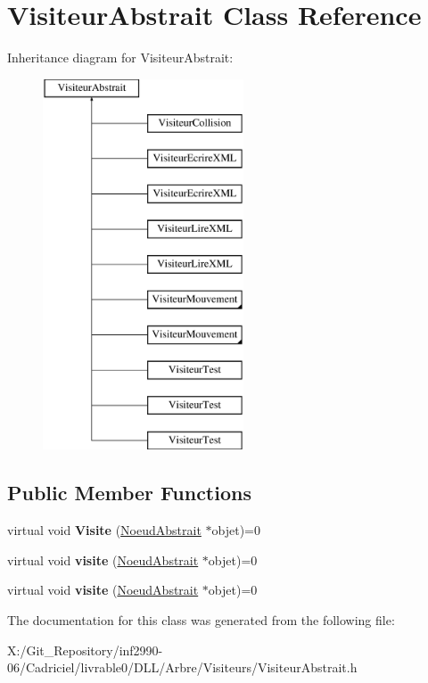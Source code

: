 \hypertarget{class_visiteur_abstrait}{\section{Visiteur\-Abstrait Class Reference}
\label{class_visiteur_abstrait}
}
Inheritance diagram for Visiteur\-Abstrait\-:\begin{figure}[H]
\begin{center}
\leavevmode
\includegraphics[height=11.000000cm]{class_visiteur_abstrait}
\end{center}
\end{figure}
\subsection*{Public Member Functions}
\begin{DoxyCompactItemize}
\item 
\hypertarget{class_visiteur_abstrait_a6bf26c4a73b84172736a8d0b7196292c}{virtual void {\bfseries Visite} (\hyperlink{class_noeud_abstrait}{Noeud\-Abstrait} $\ast$objet)=0}\label{class_visiteur_abstrait_a6bf26c4a73b84172736a8d0b7196292c}

\item 
\hypertarget{class_visiteur_abstrait_a95fe9e57ad3c13fdf25df8b36cd31f9b}{virtual void {\bfseries visite} (\hyperlink{class_noeud_abstrait}{Noeud\-Abstrait} $\ast$objet)=0}\label{class_visiteur_abstrait_a95fe9e57ad3c13fdf25df8b36cd31f9b}

\item 
\hypertarget{group__inf2990_ga95fe9e57ad3c13fdf25df8b36cd31f9b}{virtual void {\bfseries visite} (\hyperlink{class_noeud_abstrait}{Noeud\-Abstrait} $\ast$objet)=0}\label{group__inf2990_ga95fe9e57ad3c13fdf25df8b36cd31f9b}

\end{DoxyCompactItemize}


The documentation for this class was generated from the following file\-:\begin{DoxyCompactItemize}
\item 
X\-:/\-Git\-\_\-\-Repository/inf2990-\/06/\-Cadriciel/livrable0/\-D\-L\-L/\-Arbre/\-Visiteurs/Visiteur\-Abstrait.\-h\end{DoxyCompactItemize}
